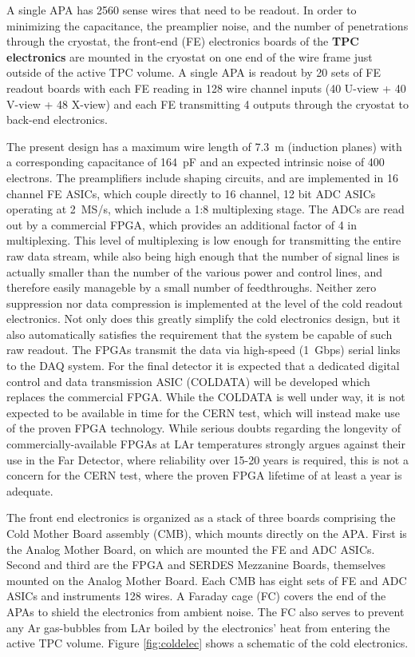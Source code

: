A single APA has 2560 sense wires that need to be readout.  In order to  minimizing the capacitance, the preamplier noise, and the number of penetrations through the cryostat, the front-end (FE) electronics boards of the {\bf TPC electronics} are mounted in the cryostat on one end of the wire frame just outside of the active TPC volume.  A single APA is readout by 20 sets of FE readout boards with each FE reading in 128 wire channel inputs (40 U-view + 40 V-view + 48 X-view) and each FE transmitting 4 outputs through the cryostat to back-end electronics.
 
The present design has a maximum wire length of 7.3~m (induction planes)
with a corresponding capacitance of 164~pF and an expected intrinsic noise of 400 electrons.
The preamplifiers include shaping circuits, and are implemented in 16 channel FE ASICs, which couple directly to 16 channel, 12 bit ADC ASICs operating at 2~MS/s, which include a 1:8 multiplexing stage.
The ADCs are read out by a commercial FPGA, which provides an additional factor of 4 in multiplexing.
This level of multiplexing is low enough for transmitting the entire raw data stream,
while also being high enough that the number of signal lines is actually smaller than the number of the various
power and control lines, and therefore easily manageble by a small number of feedthroughs.
Neither zero suppression nor data compression is implemented at the level of the cold readout electronics.
Not only does this greatly simplify the cold electronics design,
but it also automatically satisfies the requirement that the system be capable of such raw readout.
The FPGAs transmit the data via high-speed (1~Gbps) serial links to the DAQ system.
For the final detector it is expected that a dedicated digital control and data transmission ASIC (COLDATA) will be developed which
replaces the commercial FPGA.
While the COLDATA is well under way, it is not expected to be available in time for the CERN test,
which will instead make use of the proven FPGA technology.
While serious doubts regarding the longevity of commercially-available FPGAs at LAr temperatures strongly argues against
their use in the Far Detector, where reliability over 15-20 years is required,
this is not a concern for the CERN test, where the proven FPGA lifetime of at least a year is adequate.

The front end electronics is organized as a stack of three boards comprising the Cold Mother Board assembly (CMB),
which mounts directly on the APA.
First is the Analog Mother Board, on which are mounted the FE and ADC ASICs.
Second and third are the FPGA and SERDES Mezzanine Boards, themselves mounted on the Analog Mother Board.
Each CMB has eight sets of FE and ADC ASICs and instruments 128 wires.
A Faraday cage (FC) covers the end of the APAs to shield the electronics from ambient noise.
The FC also serves to prevent any Ar gas-bubbles from LAr boiled by the electronics' heat from entering the active TPC volume.
Figure \ref{fig:coldelec} shows a schematic of the cold electronics. 

